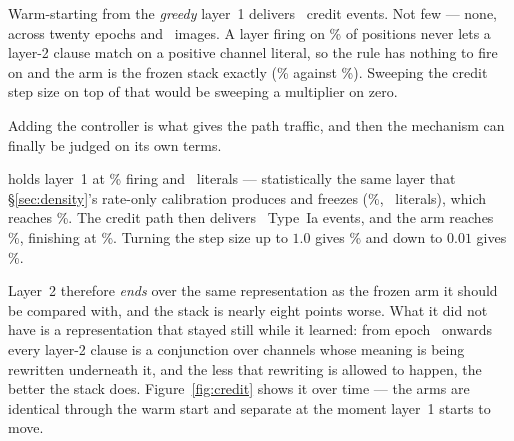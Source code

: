 \begin{ttkey}
Warm-starting from the \emph{greedy} layer~1 delivers \eventsMctmCreditWarm\ credit events.
Not few --- none, across twenty epochs and \nTrain\ images. A layer firing on
\fireGreedyPre{}\% of positions never lets a layer-2 clause match on a positive channel
literal, so the rule has nothing to fire on and the arm is the frozen stack exactly
(\accMctmCreditWarm{}\% against \accMctm{}\%). Sweeping the credit step size on top of that
would be sweeping a multiplier on zero.
\end{ttkey}

Adding the controller is what gives the path traffic, and then the mechanism can finally be
judged on its own terms.

\begin{ttkey}
 holds layer~1 at \lOneFireMctmCreditCal{}\% firing and
\lOneSizeMctmCreditCal\ literals --- statistically the same layer that
\S\ref{sec:density}'s rate-only calibration produces and freezes
(\calibFireMctmCalibRTwoZero{}\%, \calibSizeMctmCalibRTwoZero\ literals), which reaches
\accMctmCalibRTwoZero{}\%. The credit path then delivers \eventsMctmCreditCal\ Type~Ia events,
and the arm reaches \accMctmCreditCal{}\%, finishing at \finMctmCreditCal{}\%. Turning the step
size up to $1.0$ gives \accMctmCreditCalPOne{}\% and down to $0.01$ gives
\accMctmCreditCalPZeroZeroOne{}\%.
\end{ttkey}

Layer~2 therefore \emph{ends} over the same representation as the frozen arm it should be
compared with, and the stack is nearly eight points worse. What it did not have is a
representation that stayed still while it learned: from epoch \creditWarmEpochs\ onwards every
layer-2 clause is a conjunction over channels whose meaning is being rewritten underneath it,
and the less that rewriting is allowed to happen, the better the stack does.
Figure~\ref{fig:credit} shows it over time --- the arms are identical through the warm start
and separate at the moment layer~1 starts to move.

